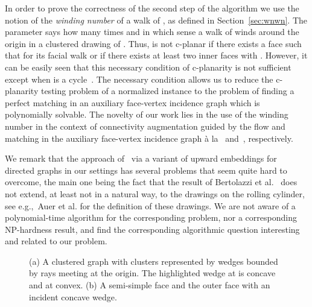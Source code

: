 \documentclass{llncs}
\def\cNP{\hbox{\rm \sffamily NP}}
\begin{document}
In order to prove the correctness of the second step of the algorithm
we use the notion of the \emph{winding number}  of a walk  of , as defined
in Section~\ref{sec:wnwn}. The parameter  says how many times and in which sense 
a walk  of  winds around the origin in a clustered drawing of .
Thus,  is not c-planar if there exists a face  such that for its facial walk  or
if there exists at least two inner faces  with .
However, it can be easily seen that this necessary condition of c-planarity is not sufficient
except when  is a cycle~\cite{CDPP05}.
The  necessary condition allows us to reduce the c-planarity testing problem of a normalized instance to the problem
of finding a perfect matching in an auxiliary face-vertex incidence graph which is polynomially solvable.
The novelty of our work lies in the use of the winding number in the context of connectivity augmentation guided
by the flow and matching in the auxiliary face-vertex incidence graph \`a la~\cite{ADDF13} and~\cite{F14+}, respectively. 

We remark that the approach of~\cite{ADDF13} via a variant of upward embeddings
for directed graphs in our settings has several problems that seem quite hard to overcome,
the main one being the fact that the result of Bertolazzi et al.~\cite{BBLM94} does not extend, at least not in a natural way, to the drawings on the rolling cylinder, see e.g.,~Auer et al.\cite{Auer201536} for the definition of these drawings.
We are not aware of a polynomial-time algorithm for the corresponding  problem,
nor a corresponding \cNP-hardness result, and
find the corresponding algorithmic question interesting and related to our problem. 

\begin{figure}
  \centering
\centering
\subfloat[]{
\label{fig:wedges}
\texttt{[image: 3ex]}
    	}
    	\hspace{10px}
\caption{(a) A clustered graph  with clusters represented by wedges bounded by rays meeting at the origin. The highlighted wedge at  is concave and at  convex. (b) A semi-simple face 
and the outer face  with an incident concave wedge.}
\end{figure}
\end{document}
